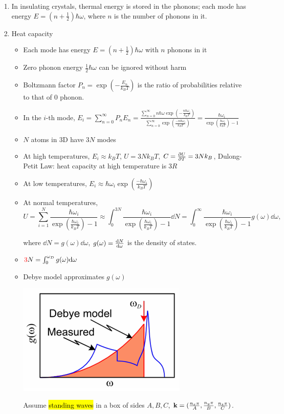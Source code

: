 \documentclass{article}
\theoremstyle{remark}
\theoremstyle{remark}
\newcommand{\where}[1]{\begin{flushright}where #1.\end{flushright}}
\begin{document}
\begin{enumerate}
    \item In insulating crystals, thermal energy is stored in the phonons; each mode has energy $E=(n+\frac{1}{2})\hbar\omega$, where $n$ is the number of phonons in it.
    \item Heat capacity\begin{itemize}
        \item Each mode has energy $E=(n+\frac{1}{2})\hbar\omega$ with $n$ phonons in it
        \item Zero phonon energy $\frac{1}{2}\hbar\omega$ can be ignored without harm
        \item Boltzmann factor $P_n=\exp\left(-\frac{E_n}{k_B T}\right)$ is the ratio of probabilities relative to that of 0 phonon.
        \item In the $i$-th mode, $E_i = \sum_{n=0}^\infty P_n E_n = \frac{\sum_{n=0}^\infty n\hbar\omega\exp\left(-\frac{n\hbar\omega_i}{k_B T}\right)}{\sum_{n=0}^\infty\exp\left(\frac{-n\hbar\omega_i}{k_B T}\right)} = \frac{\hbar\omega_i}{\exp\left(\frac{\hbar\omega_i}{k_BT}\right)-1}$
        \item $N$ atoms in 3D have $3N$ modes
        \item At high temperatures, $E_i\approx k_B T$, $U=3Nk_B T$, $C=\pdv{U}{T}=3Nk_B$, Dulong-Petit Law: heat capacity at high temperature is $3R$
        \item At low temperatures, $E_i\approx\hbar\omega_i\exp\left(\frac{-\hbar\omega_i}{k_B T}\right)$
        \item At normal temperatures, \[U=\sum_{i=1}^N\frac{\hbar\omega_i}{\exp\left(\frac{\hbar\omega_i}{k_BT}\right)-1}\approx\int_0^{3N}\frac{\hbar\omega_i}{\exp\left(\frac{\hbar\omega_i}{k_BT}\right)-1}\dd N=\int_0^\infty\frac{\hbar\omega_i}{\exp\left(\frac{\hbar\omega_i}{k_BT}\right)-1}g(\omega)\dd\omega,\] \where{$\dd N=g(\omega)\dd\omega$, $g(\omega)=\dv{N}{\omega}$ is the density of states}
        \item $\textcolor{red}{3}N=\int_0^{\omega_D}g(\omega)\dd\omega$
        \item Debye model approximates $g(\omega)$\begin{center}
            \includegraphics*[width=0.4\linewidth]{Debye model.png}
            \end{center}
            Assume \hl{standing waves} in a box of sides $A,B,C$, $\vb{k}=(\frac{n_x\pi}{A},\frac{n_y\pi}{B},\frac{n_z\pi}{C})$.
            

\end{itemize}
\end{enumerate}
\end{document}
